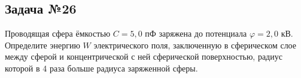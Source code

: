 \subsection{Задача №26}

Проводящая сфера ёмкостью $C=5,0$ пФ заряжена до потенциала  $\varphi=2,0$ кВ. Определите энергию $W$ электрического поля, заключенную в сферическом слое между сферой и концентрической с ней сферической поверхностью, радиус которой в 4 раза больше радиуса заряженной сферы.